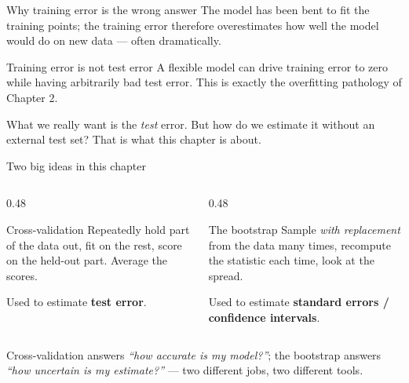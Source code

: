 \documentclass[aspectratio=169,11pt]{beamer}
\begin{document}
\begin{frame}{Why training error is the wrong answer}
  The model has been bent to fit the training points; the training
  error therefore overestimates how well the model would do on new
  data --- often dramatically.
  \begin{alertblock}{Training error is not test error}
    A flexible model can drive training error to zero while having
    arbitrarily bad test error. This is exactly the overfitting
    pathology of Chapter 2.
  \end{alertblock}
  \begin{takeaway}
    What we really want is the \emph{test} error. But how do we
    estimate it without an external test set? That is what this
    chapter is about.
  \end{takeaway}
\end{frame}

\begin{frame}{Two big ideas in this chapter}
  \begin{columns}[T]
    \begin{column}{0.48\textwidth}
      \begin{block}{Cross-validation}
        Repeatedly hold part of the data out, fit on the rest, score
        on the held-out part. Average the scores.
      \end{block}
      Used to estimate \textbf{test error}.
    \end{column}
    \begin{column}{0.48\textwidth}
      \begin{block}{The bootstrap}
        Sample \emph{with replacement} from the data many times,
        recompute the statistic each time, look at the spread.
      \end{block}
      Used to estimate \textbf{standard errors / confidence
      intervals}.
    \end{column}
  \end{columns}
  \begin{readme}
    Cross-validation answers \emph{``how accurate is my model?''};
    the bootstrap answers \emph{``how uncertain is my estimate?''} ---
    two different jobs, two different tools.
  \end{readme}
\end{frame}
\end{document}
